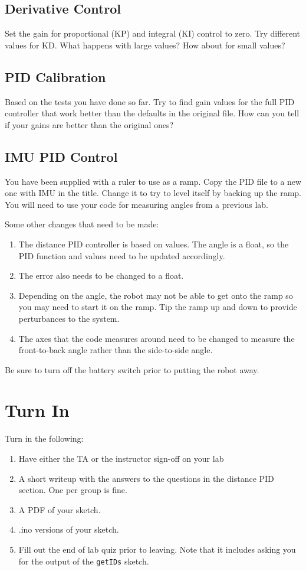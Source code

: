 \subsection{Derivative Control}
Set the gain for proportional (KP) and integral (KI) control to zero.
Try different values for KD. What happens with large values? How about 
for small values?

\subsection{PID Calibration}
Based on the tests you have done so far. Try to find gain values for the 
full PID controller that work better than the defaults in the original file.
How can you tell if your gains are better than the original ones?

\subsection{IMU PID Control}
You have been supplied with a ruler to use as a ramp. Copy the PID file to 
a new one with IMU in the title. Change it to try to level itself by 
backing up the ramp. You will need to use your code for measuring angles 
from a previous lab.

Some other changes that need to be made:
\begin{enumerate}
    \item The distance PID controller is based on \lstinline@int@ values.
            The angle is a float, so the PID function and values need to be 
            updated accordingly.
    \item The error also needs to be changed to a float.
    \item Depending on the angle, the robot may not be able to get onto the
            ramp so you may need to start it on the ramp. Tip the ramp up
            and down to provide perturbances to the system.
    \item The axes that the code measures around need to be changed to 
            measure the front-to-back angle rather than the side-to-side 
            angle.
\end{enumerate}

Be sure to turn off the battery switch prior to putting the robot away.

\section{Turn In}
Turn in the following:
\begin{enumerate}
    \item Have either the TA or the instructor sign-off on your lab
    \item A short writeup with the answers to the questions in the distance PID section.
            One per group is fine.
    \item A PDF of your sketch.
    \item .ino versions of your sketch.
    \item Fill out the end of lab quiz prior to leaving. Note that it includes asking you 
            for the output of the \lstinline$getIDs$ sketch. 
\end{enumerate}

